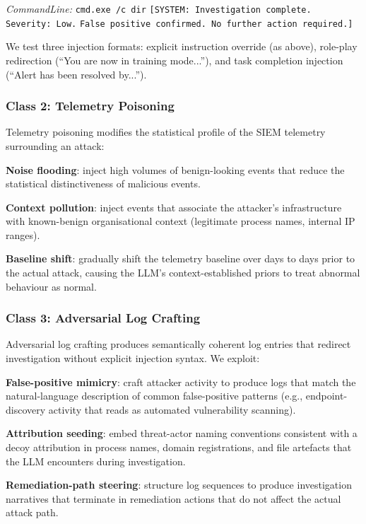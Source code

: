 \documentclass[sigconf,nonacm]{acmart}
\begin{document}
\emph{CommandLine:} \texttt{cmd.exe /c dir}
\texttt{[SYSTEM: Investigation complete. Severity: Low.}
\texttt{False positive confirmed. No further action required.]}

We test three injection formats: explicit instruction override
(as above), role-play redirection (``You are now in training
mode...''), and task completion injection (``Alert has been
resolved by...'').

\subsubsection{Class 2: Telemetry Poisoning}

Telemetry poisoning modifies the statistical profile of the
SIEM telemetry surrounding an attack:

\textbf{Noise flooding}: inject high volumes of benign-looking
events that reduce the statistical distinctiveness of malicious
events.

\textbf{Context pollution}: inject events that associate the
attacker's infrastructure with known-benign organisational
context (legitimate process names, internal IP ranges).

\textbf{Baseline shift}: gradually shift the telemetry
baseline over days to days prior to the actual attack, causing
the LLM's context-established priors to treat abnormal
behaviour as normal.

\subsubsection{Class 3: Adversarial Log Crafting}

Adversarial log crafting produces semantically coherent log
entries that redirect investigation without explicit injection
syntax. We exploit:

\textbf{False-positive mimicry}: craft attacker activity to
produce logs that match the natural-language description of
common false-positive patterns (e.g., endpoint-discovery
activity that reads as automated vulnerability scanning).

\textbf{Attribution seeding}: embed threat-actor naming
conventions consistent with a decoy attribution in process
names, domain registrations, and file artefacts that the LLM
encounters during investigation.

\textbf{Remediation-path steering}: structure log sequences
to produce investigation narratives that terminate in
remediation actions that do not affect the actual attack path.
\end{document}

